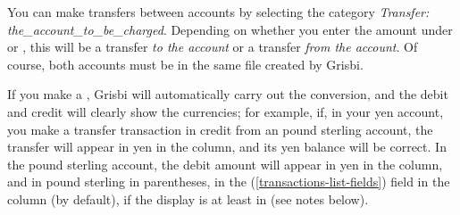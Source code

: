 You can make transfers between accounts by selecting the category \emph{Transfer: the\_account\_to\_be\_charged}. Depending on whether you enter the amount under  or , this will be a transfer \emph{to the account} or a transfer \emph{from the account}. Of course, both accounts must be in the same file created by Grisbi.

If you make a , Grisbi will automatically carry out the conversion, and the debit and credit will clearly show the currencies; for example, if, in your yen account, you make a transfer transaction in credit from an pound sterling account, the transfer will appear in yen in the  column, and its yen balance will be correct. In the pound sterling account, the debit amount will appear in yen in the  column, and in pound sterling in parentheses, in the  (\vref{transactions-list-fields}) field in the  column (by default), if the display is at least in  (see notes below).

